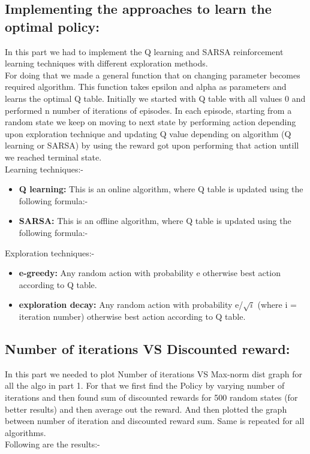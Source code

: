 \documentclass{article}
\begin{document}
\begin{enumerate}[a)]
\subsection{Implementing the approaches to learn the optimal policy:}
In this part we had to implement the Q learning and SARSA reinforcement learning techniques with different exploration methods.\\
For doing that we made a general function that on changing parameter becomes required algorithm. This function takes epsilon and alpha as
parameters and learns the optimal Q table. Initially we started with Q table with all values 0 and performed n number of iterations of episodes. In 
each episode, starting from a random state we keep on moving to next state by performing action depending upon exploration technique and updating Q value depending on
algorithm (Q learning or SARSA) by using the reward got upon performing that action untill we reached terminal state. \\

Learning techniques:- 
\begin{itemize}
    \item \textbf{Q learning: }  This is an online algorithm, where Q table is updated using the following formula:- 
        $ $
    \item \textbf{SARSA: }  This is an offline algorithm, where Q table is updated using the following formula:- 
        $ $
\end{itemize}

Exploration techniques:- 
\begin{itemize}
    \item \textbf{e-greedy: } Any random action with probability e otherwise best action according to Q table.
    \item \textbf{exploration decay: } Any random action with probability e/$\sqrt{i}$ (where i = iteration number) otherwise best action according to Q table.
\end{itemize}


\subsection{Number of iterations VS Discounted reward:}
In this part we needed to plot Number of iterations VS Max-norm dist graph for all the algo in part 1. For that we first find the Policy by varying number of iterations and then found 
sum of discounted rewards for 500 random states (for better results) and then average out the reward. And then plotted the graph between number of iteration and discounted reward sum. Same is repeated for all algorithms.\\
Following are the results:-



\end{enumerate}
\end{document}
